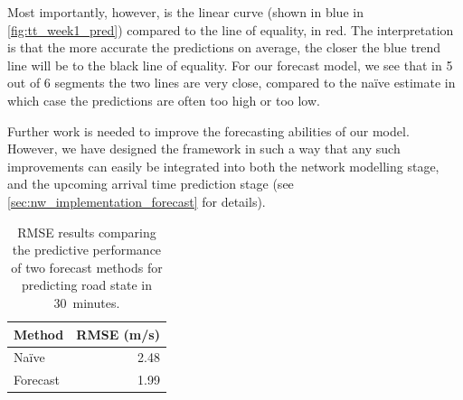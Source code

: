 Most importantly, however, is the linear curve (shown in blue in \cref{fig:tt_week1_pred}) compared to the line of equality, in red. The interpretation is that the more accurate the predictions on average, the closer the blue trend line will be to the black line of equality. For our forecast model, we see that in 5 out of 6 segments the two lines are very close, compared to the na\"ive estimate in which case the predictions are often too high or too low.


Further work is needed to improve the forecasting abilities of our model. However, we have designed the framework in such a way that any such improvements can easily be integrated into both the network modelling stage, and the upcoming arrival time prediction stage (see \cref{sec:nw_implementation_forecast} for details).

\begin{table}

\caption{\label{tab:tt_pred_rmse}RMSE results comparing the predictive performance of two forecast methods for predicting road state in 30~minutes.}
\centering
\begin{tabular}[t]{lr}
\toprule
Method & RMSE (m/s)\\
\midrule
Naïve & 2.48\\
Forecast & 1.99\\
\bottomrule
\end{tabular}
\end{table}





